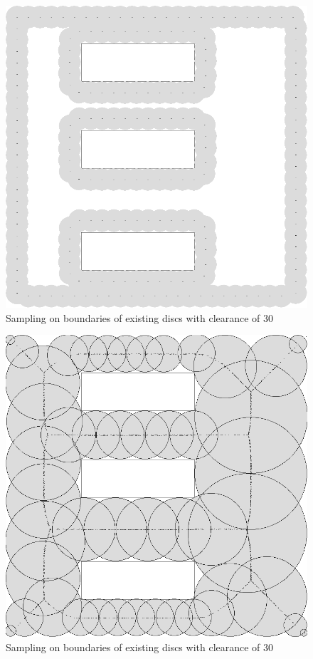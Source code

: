 \documentclass[12pt]{article}
\begin{document}
  \begin{figure}[p]
  \centering
  \includegraphics[scale=0.5]{MedialAxis_cost_30_bnd.PNG}  
  \caption{Sampling on boundaries of existing discs with clearance of 30}   
  \label{fig:ISO_n} 
  \end{figure}

  \begin{figure}[p]
  \centering
  \includegraphics[scale=0.5]{MedialAxis_bnd.PNG}  
  \caption{Sampling on boundaries of existing discs with clearance of 30}   
  \label{fig:MA_n} 
  \end{figure}        
\end{document}
